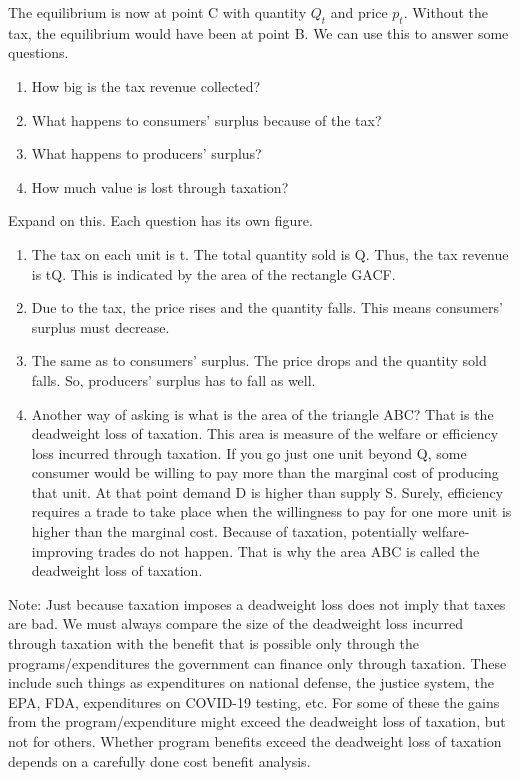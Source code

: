 \documentclass[
]{book}
\providecommand{\tightlist}{%
  \setlength{\itemsep}{0pt}\setlength{\parskip}{0pt}}
\begin{document}
The equilibrium is now at point C with quantity \(Q_t\) and price \(p_t\). Without the tax, the equilibrium would have been at point B. We can use this to answer some questions.

\begin{enumerate}
\def\labelenumi{\arabic{enumi}.}
\tightlist
\item
  How big is the tax revenue collected?
\item
  What happens to consumers' surplus because of the tax?
\item
  What happens to producers' surplus?
\item
  How much value is lost through taxation?
\end{enumerate}

\begin{addition}
Expand on this. Each question has its own figure.

\end{addition}

\begin{enumerate}
\def\labelenumi{\arabic{enumi}.}
\item
  The tax on each unit is t. The total quantity sold is Q. Thus, the tax revenue is tQ. This is indicated by the area of the rectangle GACF.
\item
  Due to the tax, the price rises and the quantity falls. This means consumers' surplus must decrease.
\item
  The same as to consumers' surplus. The price drops and the quantity sold falls. So, producers' surplus has to fall as well.
\item
  Another way of asking is what is the area of the triangle ABC? That is the deadweight loss of taxation. This area is measure of the welfare or efficiency loss incurred through taxation. If you go just one unit beyond Q, some consumer would be willing to pay more than the marginal cost of producing that unit. At that point demand D is higher than supply S. Surely, efficiency requires a trade to take place when the willingness to pay for one more unit is higher than the marginal cost. Because of taxation, potentially welfare-improving trades do not happen. That is why the area ABC is called the deadweight loss of taxation.
\end{enumerate}

Note: Just because taxation imposes a deadweight loss does not imply that taxes are bad. We must always compare the size of the deadweight loss incurred through taxation with the benefit that is possible only through the programs/expenditures the government can finance only through taxation. These include such things as expenditures on national defense, the justice system, the EPA, FDA, expenditures on COVID-19 testing, etc. For some of these the gains from the program/expenditure might exceed the deadweight loss of taxation, but not for others. Whether program benefits exceed the deadweight loss of taxation depends on a carefully done cost benefit analysis.
\end{document}
